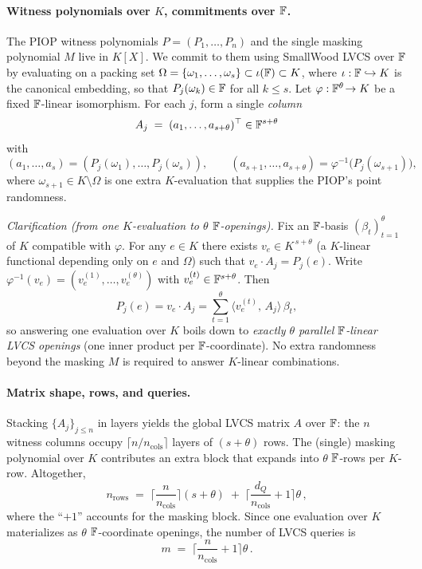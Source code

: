 \paragraph{Witness polynomials over \(K\), commitments over \(\mathbb{F}\).}
The PIOP witness polynomials \(P=(P_1,\dots,P_n)\) and the single masking polynomial \(M\) live in \(K[X]\).
We commit to them using SmallWood LVCS over \(\mathbb{F}\) by evaluating on a packing set
\(\Omega=\{\omega_1,\dots,\omega_s\}\subset \iota(\mathbb{F})\subset K\), where \(\iota:\mathbb{F}\hookrightarrow K\) is the canonical embedding, so that \(P_j(\omega_k)\in \mathbb{F}\) for all \(k\le s\).
Let \(\varphi:\mathbb{F}^{\theta}\!\to K\) be a fixed \(\mathbb{F}\)-linear isomorphism. For each \(j\), form a single \emph{column}
\[
A_j \;=\; (a_1,\dots,a_{s+\theta})^\top\in \mathbb{F}^{s+\theta}
\]
with
\[
(a_1,\dots,a_s)=(P_j(\omega_1),\dots,P_j(\omega_s)),
\qquad
(a_{s+1},\dots,a_{s+\theta})=\varphi^{-1}\!\big(P_j(\omega_{s+1})\big),
\]
where \(\omega_{s+1}\in K\setminus\Omega\) is one extra \(K\)-evaluation that supplies the PIOP’s point randomness.

\emph{Clarification (from one \(K\)-evaluation to \(\theta\) \(\mathbb{F}\)-openings).}
Fix an \(\mathbb{F}\)-basis \((\beta_t)_{t=1}^{\theta}\) of \(K\) compatible with \(\varphi\).
For any \(e\in K\) there exists \(v_e\in K^{\,s+\theta}\) (a \(K\)-linear functional depending only on \(e\) and \(\Omega\)) such that
\(v_e\cdot A_j = P_j(e)\).
Write \(\varphi^{-1}(v_e)=(v_e^{(1)},\dots,v_e^{(\theta)})\) with \(v_e^{(t)}\in \mathbb{F}^{s+\theta}\).
Then
\[
P_j(e)= v_e\!\cdot\! A_j
= \sum_{t=1}^{\theta} \big\langle v_e^{(t)},\,A_j\big\rangle \,\beta_t,
\]
so answering one evaluation over \(K\) boils down to \emph{exactly \(\theta\) parallel \(\mathbb{F}\)-linear LVCS openings} (one inner product per \(\mathbb{F}\)-coordinate). No extra randomness beyond the masking \(M\) is required to answer \(K\)-linear combinations.

\paragraph{Matrix shape, rows, and queries.}
Stacking \(\{A_j\}_{j\le n}\) in layers yields the global LVCS matrix \(A\) over \(\mathbb{F}\):
the \(n\) witness columns occupy \(\lceil n/n_{\mathrm{cols}}\rceil\) layers of \((s+\theta)\) rows.
The (single) masking polynomial over \(K\) contributes an extra block that expands into \(\theta\) \(\mathbb{F}\)-rows per \(K\)-row.
Altogether,
\begin{equation}\label{eq:sf-nrows}
n_{\mathrm{rows}}
\;=\;
\Big\lceil \frac{n}{n_{\mathrm{cols}}} \Big\rceil (s+\theta)
\;+\;
\Big\lceil \frac{d_Q}{n_{\mathrm{cols}}} + 1 \Big\rceil \theta \,,
\end{equation}
where the “\(+1\)” accounts for the masking block.
Since one evaluation over \(K\) materializes as \(\theta\) \(\mathbb{F}\)-coordinate openings, the number of LVCS queries is
\begin{equation}\label{eq:sf-m}
m
\;=\;
\Big\lceil \frac{n}{n_{\mathrm{cols}}} + 1 \Big\rceil \theta \, .
\end{equation}


